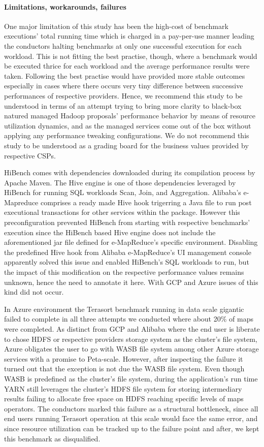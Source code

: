 \documentclass[review]{elsarticle}
\begin{document}
\paragraph{Limitations, workarounds, failures}One major limitation of this study has been the high-cost of benchmark executions' total running time which is charged in a pay-per-use manner leading the conductors halting benchmarks at only one successful execution for each workload. This is not fitting the best practise, though, where a benchmark would be executed thrice for each workload and the average performance results were taken. Following the best practise would have provided more stable outcomes especially in cases where there occurs very tiny difference between successive performances of respective providers. Hence, we recommend this study to be understood in terms of an attempt trying to bring more clarity to black-box natured managed Hadoop proposals' performance behavior by means of resource utilization dynamics, and as the managed services come out of the box without applying any performance tweaking configurations. We do not recommend this study to be understood as a grading board for the business values provided by respective CSPs.

HiBench comes with dependencies downloaded during its compilation process by Apache Maven. The Hive engine is one of those dependencies leveraged by HiBench for running SQL workloads Scan, Join, and Aggregation. Alibaba's e-Mapreduce comprises a ready made Hive hook trigerring a Java file to run post executional transactions for other services within the package. However this preconfiguration prevented HiBench from starting with respective benchmarks' execution since the HiBench based Hive engine does not include the aforementioned jar file defined for e-MapReduce's specific environment. Disabling the predefined Hive hook from Alibaba e-MapReduce's UI management console apparently solved this issue and enabled HiBench's SQL workloads to run, but the impact of this modification on the respective performance values remains unknown, hence the need to annotate it here. With GCP and Azure issues of this kind did not occur.

In Azure environment the Terasort benchmark running in data scale gigantic failed to complete in all three attempts we conducted where about 20\% of maps were completed. As distinct from GCP and Alibaba where the end user is liberate to chose HDFS or respective providers storage system as the cluster's file system, Azure obligates the user to go with WASB file system among other Azure storage services with a promise to Peta-scale. However, after inspecting the failure it turned out that the exception is not due the WASB file system. Even though WASB is predefined as the cluster's file system, during the application's run time YARN still leverages the cluster's HDFS file system for storing intermediary results failing to allocate free space on HDFS reaching specific levels of maps operators. The conductors marked this failure as a structural bottleneck, since all end users running Terasort operation at this scale would face the same error, and since resource utilization can be tracked up to the failure point and after, we kept this benchmark as disqualified.
\end{document}
